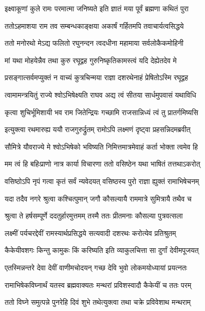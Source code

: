 \twolineshloka
{इक्ष्वाकूणां कुले रामः परमात्मा जनिष्यते}
{इति ज्ञातं मया पूर्वं ब्रह्मणा कथितं पुरा} %

\twolineshloka
{ततोऽहमाशया राम तव सम्बन्धकाङ्क्षया}
{अकार्षं गर्हितमपि तवाचार्यत्वसिद्धये} %

\twolineshloka
{ततो मनोरथो मेऽद्य फलितो रघुनन्दन}
{त्वदधीना महामाया सर्वलोकैकमोहिनी} %

\twolineshloka
{मां यथा मोहयेन्नैव तथा कुरु रघूद्वह}
{गुरुनिष्कृतिकामस्त्वं यदि देह्येतदेव मे} %

\twolineshloka
{प्रसङ्गात्सर्वमप्युक्तं न वाच्यं कुत्रचिन्मया}
{राज्ञा दशरथेनाहं प्रेषितोऽस्मि रघूद्वह} %

\twolineshloka
{त्वामामन्त्रयितुं राज्ये श्वोऽभिषेक्ष्यति राघव}
{अद्य त्वं सीतया सार्धमुपवासं यथाविधि} %

\twolineshloka
{कृत्वा शुचिर्भूमिशायी भव राम जितेन्द्रियः}
{गच्छामि राजसान्निध्यं त्वं तु प्रातर्गमिष्यसि} %

\twolineshloka
{इत्युक्त्वा रथमारुह्य ययौ राजगुरुर्द्रुतम्}
{रामोऽपि लक्ष्मणं दृष्ट्वा प्रहसन्निदमब्रवीत्} %

\twolineshloka
{सौमित्रे यौवराज्ये मे श्वोऽभिषेको भविष्यति}
{निमित्तमात्रमेवाहं कर्ता भोक्ता त्वमेव हि} %

\twolineshloka
{मम त्वं हि बहिःप्राणो नात्र कार्या विचारणा}
{ततो वसिष्ठेन यथा भाषितं तत्तथाऽकरोत्} %

\twolineshloka
{वसिष्ठोऽपि नृपं गत्वा कृतं सर्वं न्यवेदयत्}
{वसिष्ठस्य पुरो राज्ञा ह्युक्तं रामाभिषेचनम्} %

\twolineshloka
{यदा तदैव नगरे श्रुत्वा कश्चित्पुमान् जगौ}
{कौसल्यायै राममात्रे सुमित्रायै तथैव च} %

\twolineshloka
{श्रुत्वा ते हर्षसम्पूर्णे ददतुर्हारमुत्तमम्}
{तस्मै ततः प्रीतमनाः कौसल्या पुत्रवत्सला} %

\twolineshloka
{लक्ष्मीं पर्यचरद्देवीं रामस्यार्थप्रसिद्धये}
{सत्यवादी दशरथः करोत्येव प्रतिश्रुतम्} %

\twolineshloka
{कैकेयीवशगः किन्तु कामुकः किं करिष्यति}
{इति व्याकुलचित्ता सा दुर्गां देवीमपूजयत्} %

\twolineshloka
{एतस्मिन्नन्तरे देवा देवीं वाणीमचोदयन्}
{गच्छ देवि भुवो लोकमयोध्यायां प्रयत्नतः} %

\twolineshloka
{रामाभिषेकविघ्नार्थं यतस्व ब्रह्मवाक्यतः}
{मन्थरां प्रविशस्वादौ कैकेयीं च ततः परम्} %

\twolineshloka
{ततो विघ्ने समुत्पन्ने पुनरेहि दिवं शुभे}
{तथेत्युक्त्वा तथा चक्रे प्रविवेशाथ मन्थराम्} %

